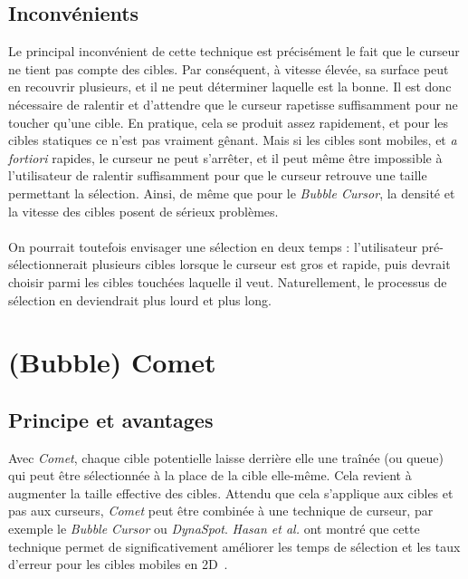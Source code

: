 	\subsection{Inconvénients}
	Le principal inconvénient de cette technique est précisément le fait que le curseur ne tient pas compte des cibles. Par conséquent, à vitesse élevée, sa surface peut en recouvrir plusieurs, et il ne peut déterminer laquelle est la bonne. Il est donc nécessaire de ralentir et d'attendre que le curseur rapetisse suffisamment pour ne toucher qu'une cible. En pratique, cela se produit assez rapidement, et pour les cibles statiques ce n'est pas vraiment gênant. Mais si les cibles sont mobiles, et \emph{a fortiori} rapides, le curseur ne peut s'arrêter, et il peut même être impossible à l'utilisateur de ralentir suffisamment pour que le curseur retrouve une taille permettant la sélection. Ainsi, de même que pour le \emph{Bubble Cursor}, la densité et la vitesse des cibles posent de sérieux problèmes.

	\paragraph{}	
	On pourrait toutefois envisager une sélection en deux temps : l'utilisateur pré-sélectionnerait plusieurs cibles lorsque le curseur est gros et rapide, puis devrait choisir parmi les cibles touchées laquelle il veut. Naturellement, le processus de sélection en deviendrait plus lourd et plus long.

\section{(Bubble) Comet}
	\subsection{Principe et avantages}
	Avec \emph{Comet}, chaque cible potentielle laisse derrière elle une traînée (ou queue) qui peut être sélectionnée à la place de la cible elle-même. Cela revient à augmenter la taille effective des cibles. Attendu que cela s'applique aux cibles et pas aux curseurs, \emph{Comet} peut être combinée à une technique de curseur, par exemple le \emph{Bubble Cursor} ou \emph{DynaSpot}. \emph{Hasan et al.} ont montré que cette technique permet de significativement améliorer les temps de sélection et les taux d'erreur pour les cibles mobiles en 2D~\cite{hasan2011comet}.

